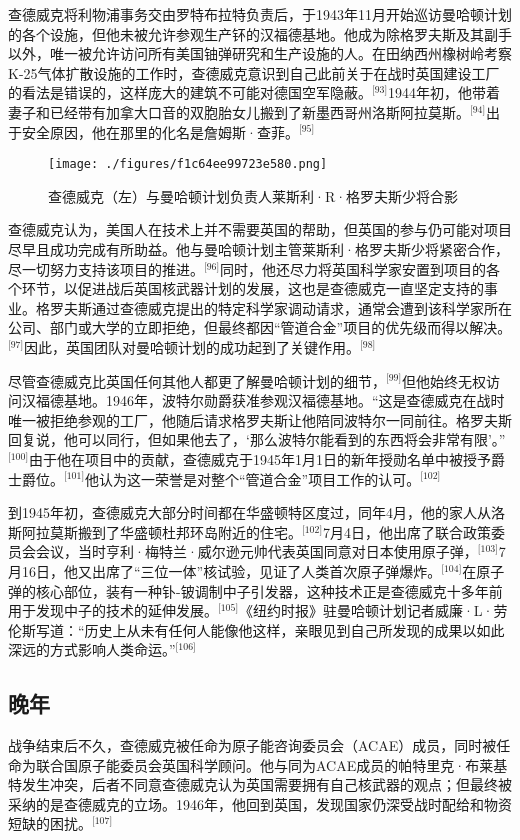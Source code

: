 查德威克将利物浦事务交由罗特布拉特负责后，于1943年11月开始巡访曼哈顿计划的各个设施，但他未被允许参观生产钚的汉福德基地。他成为除格罗夫斯及其副手以外，唯一被允许访问所有美国铀弹研究和生产设施的人。在田纳西州橡树岭考察K-25气体扩散设施的工作时，查德威克意识到自己此前关于在战时英国建设工厂的看法是错误的，这样庞大的建筑不可能对德国空军隐蔽。\(^\text{[93]}\)1944年初，他带着妻子和已经带有加拿大口音的双胞胎女儿搬到了新墨西哥州洛斯阿拉莫斯。\(^\text{[94]}\)出于安全原因，他在那里的化名是詹姆斯·查菲。\(^\text{[95]}\)
\begin{figure}[ht]
\centering
\texttt{[image: ./figures/f1c64ee99723e580.png]}
\caption{查德威克（左）与曼哈顿计划负责人莱斯利·R·格罗夫斯少将合影} \label{fig_ZMcdw_7}
\end{figure}
查德威克认为，美国人在技术上并不需要英国的帮助，但英国的参与仍可能对项目尽早且成功完成有所助益。他与曼哈顿计划主管莱斯利·格罗夫斯少将紧密合作，尽一切努力支持该项目的推进。\(^\text{[96]}\)同时，他还尽力将英国科学家安置到项目的各个环节，以促进战后英国核武器计划的发展，这也是查德威克一直坚定支持的事业。格罗夫斯通过查德威克提出的特定科学家调动请求，通常会遭到该科学家所在公司、部门或大学的立即拒绝，但最终都因“管道合金”项目的优先级而得以解决。\(^\text{[97]}\)因此，英国团队对曼哈顿计划的成功起到了关键作用。\(^\text{[98]}\)

尽管查德威克比英国任何其他人都更了解曼哈顿计划的细节，\(^\text{[99]}\)但他始终无权访问汉福德基地。1946年，波特尔勋爵获准参观汉福德基地。“这是查德威克在战时唯一被拒绝参观的工厂，他随后请求格罗夫斯让他陪同波特尔一同前往。格罗夫斯回复说，他可以同行，但如果他去了，‘那么波特尔能看到的东西将会非常有限’。”\(^\text{[100]}\)由于他在项目中的贡献，查德威克于1945年1月1日的新年授勋名单中被授予爵士爵位。\(^\text{[101]}\)他认为这一荣誉是对整个“管道合金”项目工作的认可。\(^\text{[102]}\)

到1945年初，查德威克大部分时间都在华盛顿特区度过，同年4月，他的家人从洛斯阿拉莫斯搬到了华盛顿杜邦环岛附近的住宅。\(^\text{[102]}\)7月4日，他出席了联合政策委员会会议，当时亨利·梅特兰·威尔逊元帅代表英国同意对日本使用原子弹，\(^\text{[103]}\)7月16日，他又出席了“三位一体”核试验，见证了人类首次原子弹爆炸。\(^\text{[104]}\)在原子弹的核心部位，装有一种钋-铍调制中子引发器，这种技术正是查德威克十多年前用于发现中子的技术的延伸发展。\(^\text{[105]}\)《纽约时报》驻曼哈顿计划记者威廉·L·劳伦斯写道：“历史上从未有任何人能像他这样，亲眼见到自己所发现的成果以如此深远的方式影响人类命运。”\(^\text{[106]}\)
\subsection{晚年}
战争结束后不久，查德威克被任命为原子能咨询委员会（ACAE）成员，同时被任命为联合国原子能委员会英国科学顾问。他与同为ACAE成员的帕特里克·布莱基特发生冲突，后者不同意查德威克认为英国需要拥有自己核武器的观点；但最终被采纳的是查德威克的立场。1946年，他回到英国，发现国家仍深受战时配给和物资短缺的困扰。\(^\text{[107]}\)

